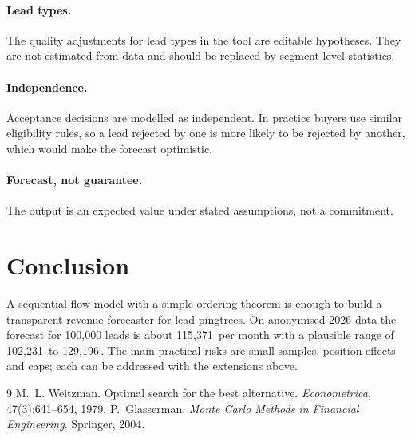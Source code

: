 \documentclass[10pt,a4paper]{article}
\begin{document}
\paragraph{Lead types.} The quality adjustments for lead types in the tool are editable hypotheses. They are not estimated from data and should be replaced by segment-level statistics.
\paragraph{Independence.} Acceptance decisions are modelled as independent. In practice buyers use similar eligibility rules, so a lead rejected by one is more likely to be rejected by another, which would make the forecast optimistic.
\paragraph{Forecast, not guarantee.} The output is an expected value under stated assumptions, not a commitment.

\section{Conclusion}
A sequential-flow model with a simple ordering theorem is enough to build a transparent revenue forecaster for lead pingtrees. On anonymised 2026 data the forecast for 100{,}000 leads is about 115,371\,\texteuro{} per month with a plausible range of 102,231\,\texteuro{} to 129,196\,\texteuro{}. The main practical risks are small samples, position effects and caps; each can be addressed with the extensions above.

\begin{thebibliography}{9}
 M.~L. Weitzman. Optimal search for the best alternative. \emph{Econometrica}, 47(3):641--654, 1979.
 P.~Glasserman. \emph{Monte Carlo Methods in Financial Engineering}. Springer, 2004.
\end{thebibliography}
\end{document}

